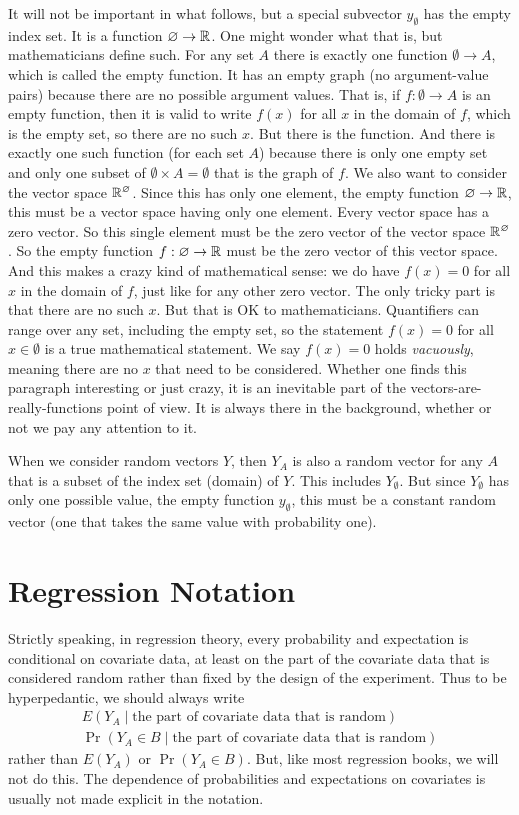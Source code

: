 It will not be important in what follows, but a special subvector
$y_\emptyset$ has the empty index set.
It is a function $\varnothing \to \mathbb{R}$.
One might wonder what that is, but mathematicians define such.
For any set $A$ there is exactly one function $\emptyset \to A$,
which is called the empty function.  It has an empty graph
(no argument-value pairs) because there are no possible argument values.
That is, if $f : \emptyset \to A$ is an empty function, then it is
valid to write $f(x)$ for all $x$ in the domain of $f$, which is the
empty set, so there are no such $x$.  But there is the function.
And there is exactly one such function (for each set $A$) because there
is only one empty set and only one subset of
$\emptyset \times A = \emptyset$ that is the graph of $f$.
We also want to consider the vector space $\mathbb{R}^\varnothing$.
Since this has only one element, the empty function $\varnothing \to \mathbb{R}$,
this must be a vector space having only one element.  Every vector space
has a zero vector.  So this single element must be the zero vector of the
vector space $\mathbb{R}^\varnothing$.
So the empty function $f : \varnothing \to \mathbb{R}$ must be the zero vector
of this vector space.  And this makes a crazy kind of mathematical sense:
we do have $f(x) = 0$ for all $x$ in the domain of $f$, just like for
any other zero vector.  The only tricky part is that there are no such $x$.
But that is OK to mathematicians.  Quantifiers can range over any set,
including the empty set, so the statement $f(x) = 0$ for all $x \in \emptyset$
is a true mathematical statement.  We say $f(x) = 0$ holds \emph{vacuously},
meaning there are no $x$ that need to be considered.
Whether one finds this paragraph interesting or just crazy, it is an
inevitable part of the vectors-are-really-functions point of view.
It is always there in the background, whether or not we pay any attention
to it.

When we consider random vectors $Y$, then $Y_A$ is also a random vector
for any $A$ that is a subset of the index set (domain) of $Y$.
This includes $Y_\emptyset$.  But since $Y_\emptyset$ has only one
possible value, the empty function $y_\emptyset$, this must be a constant
random vector (one that takes the same value with probability one).

\section{Regression Notation}

Strictly speaking, in regression theory, every probability and expectation
is conditional on covariate data, at least on the part of the covariate data
that is considered random rather than fixed by the design of the experiment.
Thus to be hyperpedantic, we should always write
\begin{gather*}
   E(Y_A \mid \text{the part of covariate data that is random})
   \\
   \Pr(Y_A \in B \mid \text{the part of covariate data that is random})
\end{gather*}
rather than $E(Y_A)$ or $\Pr(Y_A \in B)$.  But, like most regression books,
we will not do this.  The dependence of probabilities and expectations on
covariates is usually not made explicit in the notation.

